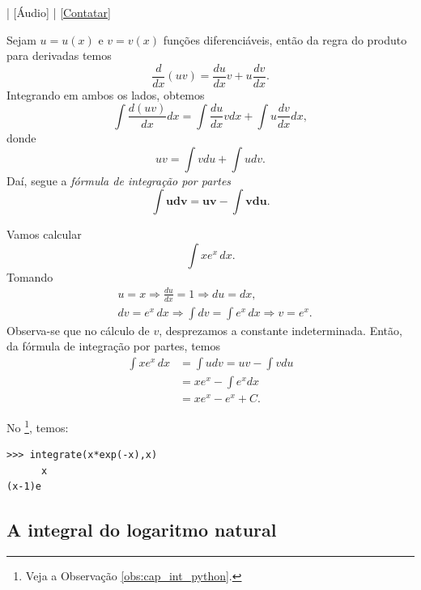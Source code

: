 \begin{flushright}
  [Vídeo] | [Áudio] | \href{https://phkonzen.github.io/notas/contato.html}{[Contatar]}
\end{flushright}

Sejam $u=u(x)$ e $v=v(x)$ funções diferenciáveis, então da regra do produto para derivadas temos
\begin{equation}
  \frac{d}{dx}(uv) = \frac{du}{dx}v + u\frac{dv}{dx}.
\end{equation}
Integrando em ambos os lados, obtemos
\begin{equation}
  \int \frac{d (uv)}{dx}dx = \int \frac{du}{dx}vdx + \int u\frac{dv}{dx}dx,
\end{equation}
donde
\begin{equation}
  uv = \int vdu + \int udv.
\end{equation}
Daí, segue a \emph{fórmula de integração por partes}
\begin{equation}
  \pmb{\int udv = uv - \int vdu}.
\end{equation}

\begin{ex}
  Vamos calcular
  \begin{equation}
    \int xe^x\,dx.
  \end{equation}
  Tomando
  \begin{align}
    &u = x \Rightarrow \frac{du}{dx} = 1 \Rightarrow du = dx,\\
    &dv = e^x\,dx \Rightarrow \int dv = \int e^x\,dx \Rightarrow v = e^x.
  \end{align}
  Observa-se que no cálculo de $v$, desprezamos a constante indeterminada. Então, da fórmula de integração por partes, temos
  \begin{align}
    \int xe^x\,dx &= \int udv = uv - \int vdu \\
                  &= xe^x - \int e^xdx \\
                  &= xe^x - e^x + C.
  \end{align}
  
  \ifispython
  No \sympy\footnote{Veja a Observação \ref{obs:cap_int_python}.}, temos:
\begin{verbatim}
>>> integrate(x*exp(-x),x)
      x
(x-1)e
\end{verbatim}
  \fi
\end{ex}

\subsection{A integral do logaritmo natural}

